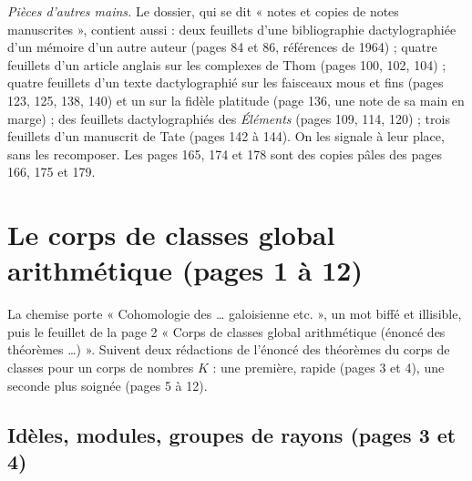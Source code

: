 \documentclass[11pt,a4paper]{article}
\begin{document}
\emph{Pièces d'autres mains.} Le dossier, qui se dit « notes et copies de notes
manuscrites », contient aussi : deux feuillets d'une bibliographie dactylographiée
d'un mémoire d'un autre auteur (pages 84 et 86, références de 1964) ; quatre
feuillets d'un article anglais sur les complexes de Thom (pages 100, 102, 104) ;
quatre feuillets d'un texte dactylographié sur les faisceaux mous et fins (pages
123, 125, 138, 140) et un sur la fidèle platitude (page 136, une note de sa main
en marge) ; des feuillets dactylographiés des \emph{Éléments} (pages 109, 114,
120) ; trois feuillets d'un manuscrit de Tate (pages 142 à 144). On les signale
à leur place, sans les recomposer. Les pages 165, 174 et 178 sont des copies
pâles des pages 166, 175 et 179.

\section*{Le corps de classes global arithmétique (pages 1 à 12)}

La chemise porte « Cohomologie des … galoisienne etc. », un mot biffé et
illisible, puis le feuillet de la page 2 « Corps de classes global arithmétique
(énoncé des théorèmes …) ». Suivent deux rédactions de l'énoncé des théorèmes
du corps de classes pour un corps de nombres $K$ : une première, rapide (pages 3
et 4), une seconde plus soignée (pages 5 à 12).

\subsection*{Idèles, modules, groupes de rayons (pages 3 et 4)}
\end{document}
